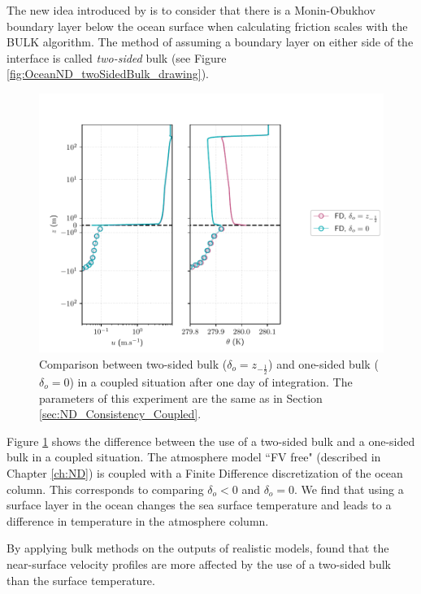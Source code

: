 The new idea introduced by \citep{pelletier_two-sided_2021} is to consider
that there is a Monin-Obukhov boundary layer 
below the ocean surface when calculating friction scales with the BULK algorithm. 
The method of assuming a boundary layer on either side of the interface is called
 \textit{two-sided} bulk (see Figure \ref{fig:OceanND_twoSidedBulk_drawing}).
	\begin{figure}
	\centering
\includegraphics[scale=0.6]{images/compare_two_sided_one_sided.pdf}
	\caption{Comparison between
	two-sided bulk ($\delta_o=z_{-\frac{1}{2}}$) and
	one-sided bulk ($\delta_o=0$) in a coupled
	situation after one day of integration. The parameters
	of this experiment are the same as in
	Section \ref{sec:ND_Consistency_Coupled}.
	}
	\label{fig:OceanND_twoSidedBulk_difference}
\end{figure}
\par
Figure \ref{fig:OceanND_twoSidedBulk_difference} shows the difference
between the use of a two-sided bulk and a one-sided bulk in
a coupled situation. The atmosphere model ``FV free"
(described in Chapter \ref{ch:ND}) is coupled with a Finite Difference
discretization of the ocean column.
This corresponds to comparing $\delta_o < 0$ and $\delta_o = 0$.
We find that using a surface layer in the ocean changes the
sea surface temperature and leads to a difference
in temperature in the atmosphere column.
\par
By applying bulk methods on the outputs of realistic models,
\citep{pelletier_two-sided_2021} found that the near-surface
velocity profiles are more affected by the use of a
two-sided bulk than the surface temperature.
